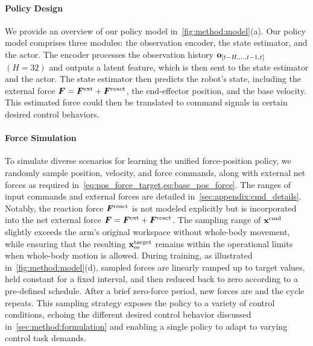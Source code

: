 \documentclass{article}
\begin{document}
\paragraph{Policy Design} \label{sec:learning:policy_design}
We provide an overview of our policy model in~\cref{fig:method:model}(a). Our policy model comprises three modules: the observation encoder, the state estimator, and the actor. The encoder processes the observation history ${\mathbf{o}}_{[t-H, \dots, t-1, t]}$ $(H = 32)$ and outputs a latent feature, which is then sent to the state estimator and the actor. The state estimator then predicts the robot's state, including the external force ${\bm{F}} = {\bm{F}}^{\text{ext}} + {\bm{F}}^{\text{react}}$, the end-effector position, and the base velocity. This estimated force could then be translated to command signals in certain desired control behaviors. 


\vspace{-5pt}

\paragraph{Force Simulation}
\label{sec:learning:policy_learning}
To simulate diverse scenarios for learning the unified force-position policy, we randomly sample position, velocity, and force commands, along with external net forces as required in~\cref{eq:pos_force_target,eq:base_pos_force}. The ranges of input commands and external forces are detailed in~\cref{sec:appendix:cmd_details}. Notably, the reaction force ${\bm{F}}^{\text{react}}$ is not modeled explicitly but is incorporated into the net external force ${\bm{F}} = {\bm{F}}^{\text{ext}} + {\bm{F}}^{\text{react}}$. 
The sampling range of ${\mathbf{x}}^{\text{cmd}}$ slightly exceeds the arm's original workspace without whole-body movement, while ensuring that the resulting ${\mathbf{x}}^{\text{target}}_{\text{ee}}$ remains within the operational limits when whole-body motion is allowed.
During training, as illustrated in~\cref{fig:method:model}(d), sampled forces are linearly ramped up to target values, held constant for a fixed interval, and then reduced back to zero according to a pre-defined schedule. After a brief zero-force period, new forces are and the cycle repeats. This sampling strategy exposes the policy to a variety of control conditions, echoing the different desired control behavior discussed in~\cref{sec:method:formulation} and enabling a single policy to adapt to varying control task demands. 
\end{document}
